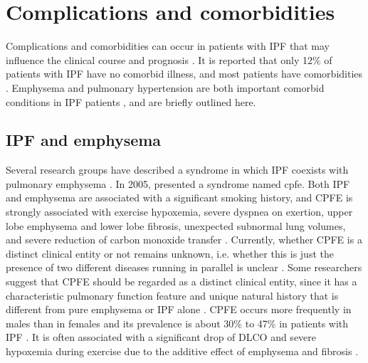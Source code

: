 \section{Complications and comorbidities}
Complications and comorbidities can occur in patients with IPF that may influence the clinical course and prognosis \citep{xaubet2017idiopathic,king2017idiopathic,martinez2017idiopathic}. It is reported that only 12\% of patients with IPF have no comorbid illness, and most patients have comorbidities \citep{raghu2011official, kim2015natural, harari2016epidemiology, kreuter2016impact}. Emphysema and pulmonary hypertension are both important comorbid conditions in IPF patients \citep{raghu2015comorbidities,martinez2017idiopathic}, and are briefly outlined here.

\subsection{IPF and emphysema}

Several research groups have described a syndrome in which IPF coexists with pulmonary emphysema \citep{wells1997lone, wells2003idiopathic, cottin2005combined,meltzer2008idiopathic}. In 2005, \cite{cottin2005combined} presented a syndrome named \gls{cpfe}. Both IPF and emphysema are associated with a significant smoking history, and CPFE is strongly associated with exercise hypoxemia, severe dyspnea on exertion, upper lobe emphysema and lower lobe fibrosis, unexpected subnormal lung volumes, and severe reduction of carbon monoxide transfer \citep{silva2008idiopathic,mejia2009idiopathic,cottin2010pulmonary,king2011idiopathic,lin2015combined}. Currently, whether CPFE is a distinct clinical entity or not remains unknown, i.e. whether this is just the presence of two different diseases running in parallel is unclear \citep{king2011idiopathic,lin2015combined}. Some researchers suggest that CPFE should be regarded as a distinct clinical entity, since it has a characteristic pulmonary function feature and unique natural history that is different from pure emphysema or IPF alone \citep{cottin2005combined, lin2015combined, xaubet2017idiopathic}. CPFE occurs more frequently in males than in females and its prevalence is about 30\% to 47\% in patients with IPF \citep{xaubet2017idiopathic}. It is often associated with a significant drop of DLCO and severe hypoxemia during exercise due to the additive effect of emphysema and fibrosis \citep{xaubet2017idiopathic}. 
\newpage

